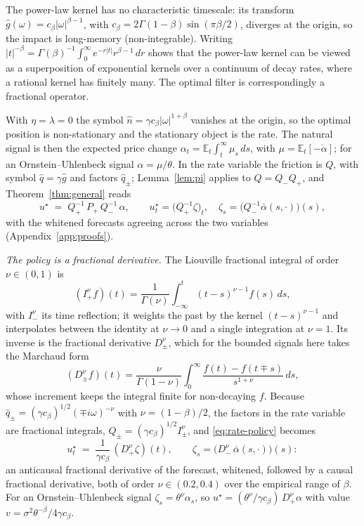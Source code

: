 \documentclass[11pt]{article}
\newcommand{\E}{\mathbb{E}}
\theoremstyle{plain}
\theoremstyle{definition}
\theoremstyle{remark}
\begin{document}
The power-law kernel has no characteristic timescale: its transform $\hat g(\omega)=c_\beta|\omega|^{\beta-1}$, with $c_\beta=2\Gamma(1-\beta)\sin(\pi\beta/2)$, diverges at the origin, so the impact is long-memory (non-integrable). Writing $|t|^{-\beta}=\Gamma(\beta)^{-1}\int_0^\infty e^{-r|t|}r^{\beta-1}\,dr$ shows that the power-law kernel can be viewed as a superposition of exponential kernels over a continuum of decay rates, where a rational kernel has finitely many. The optimal filter is correspondingly a fractional operator.

With $\eta=\lambda=0$ the symbol $\hat n=\gamma c_\beta|\omega|^{1+\beta}$ vanishes at the origin, so the optimal position is non-stationary and the stationary object is the rate. The natural signal is then the expected price change $\alpha_t=\E_t\int_t^\infty\mu_s\,ds$, with $\mu=\E_t[-\dot\alpha]$; for an Ornstein--Uhlenbeck signal $\alpha=\mu/\theta$. In the rate variable the friction is $Q$, with symbol $\hat q=\gamma\hat g$ and factors $\hat q_\pm$; Lemma~\ref{lem:pi} applies to $Q=Q_-Q_+$, and Theorem~\ref{thm:general} reads
\begin{equation}\label{eq:rate-policy}
u^\star \;=\; Q_+^{-1}\,P_+\,Q_-^{-1}\,\alpha,
\qquad u^\star_t=\bigl(Q_+^{-1}\zeta\bigr)_t,\quad \zeta_s=\bigl(Q_-^{-1}\bar\alpha(s,\cdot)\bigr)(s),
\end{equation}
with the whitened forecasts agreeing across the two variables (Appendix~\ref{app:proofs}).

\emph{The policy is a fractional derivative.} The Liouville fractional integral of order $\nu\in(0,1)$ is
\[
(I^\nu_+f)(t)=\frac{1}{\Gamma(\nu)}\int_{-\infty}^t(t-s)^{\nu-1}f(s)\,ds,
\]
with $I^\nu_-$ its time reflection; it weights the past by the kernel $(t-s)^{\nu-1}$ and interpolates between the identity at $\nu\to0$ and a single integration at $\nu=1$. Its inverse is the fractional derivative $D^\nu_\pm$, which for the bounded signals here takes the Marchaud form \citep{SamkoKilbasMarichev1993}
\[
(D^\nu_\pm f)(t)=\frac{\nu}{\Gamma(1-\nu)}\int_0^\infty\frac{f(t)-f(t\mp s)}{s^{1+\nu}}\,ds ,
\]
whose increment keeps the integral finite for non-decaying $f$. Because $\hat q_\pm=(\gamma c_\beta)^{1/2}(\mp i\omega)^{-\nu}$ with $\nu=(1-\beta)/2$, the factors in the rate variable are fractional integrals, $Q_\pm=(\gamma c_\beta)^{1/2}I^\nu_\pm$, and \eqref{eq:rate-policy} becomes
\begin{equation}\label{eq:fractional}
u^\star_t \;=\; \frac{1}{\gamma c_\beta}\,(D^\nu_+\zeta)(t),
\qquad \zeta_s=\bigl(D^\nu_-\,\bar\alpha(s,\cdot)\bigr)(s):
\end{equation}
an anticausal fractional derivative of the forecast, whitened, followed by a causal fractional derivative, both of order $\nu\in(0.2,0.4)$ over the empirical range of $\beta$. For an Ornstein--Uhlenbeck signal $\zeta_s=\theta^\nu\alpha_s$, so $u^\star=(\theta^\nu/\gamma c_\beta)\,D^\nu_+\alpha$ with value $v=\sigma^2\theta^{-\beta}/4\gamma c_\beta$.
\end{document}
